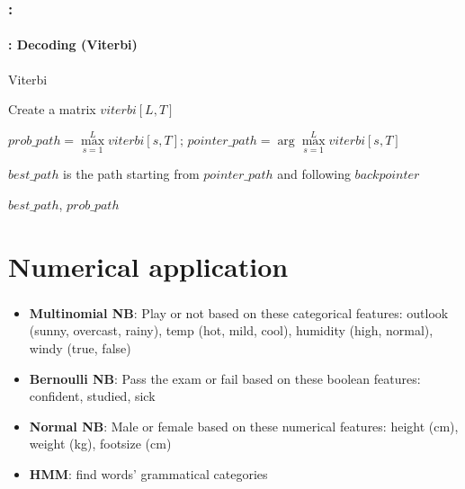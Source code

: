 \documentclass[xcolor=table]{beamer}
\begin{document}
\begin{frame}
	\frametitle{\insertshortsubtitle: \insertsection}
	\framesubtitle{\insertsubsection: Decoding (Viterbi)}
	
	\begin{block}{Viterbi}
		\scriptsize
		\begin{algorithm}[H]
			
			Create a matrix $viterbi[L, T]$\;
			
			
			
			$prob\_path = \max\limits_{s=1}^L viterbi[s, T];\, pointer\_path = \arg\max\limits_{s=1}^L viterbi[s, T]$\;
			
			$best\_path$ is the path starting from $pointer\_path$ and following $backpointer$
			
			\Return $best\_path$, $prob\_path$\;
			
		\end{algorithm}
	\end{block}
	
\end{frame}


\section{Numerical application}

\begin{frame}
	\frametitle{\insertshortsubtitle}
	\framesubtitle{\insertsection}
	
	\begin{itemize}
		\item \textbf{Multinomial NB}: Play or not based on these categorical features: outlook (sunny, overcast, rainy), temp (hot, mild, cool), humidity (high, normal), windy (true, false)
		\item \textbf{Bernoulli NB}: Pass the exam or fail based on these boolean features: confident, studied, sick
		\item \textbf{Normal NB}: Male or female based on these numerical features: height (cm), weight (kg), footsize (cm)
		\item \textbf{HMM}: find words' grammatical categories
	\end{itemize}
	
	
\end{frame}
\end{document}
